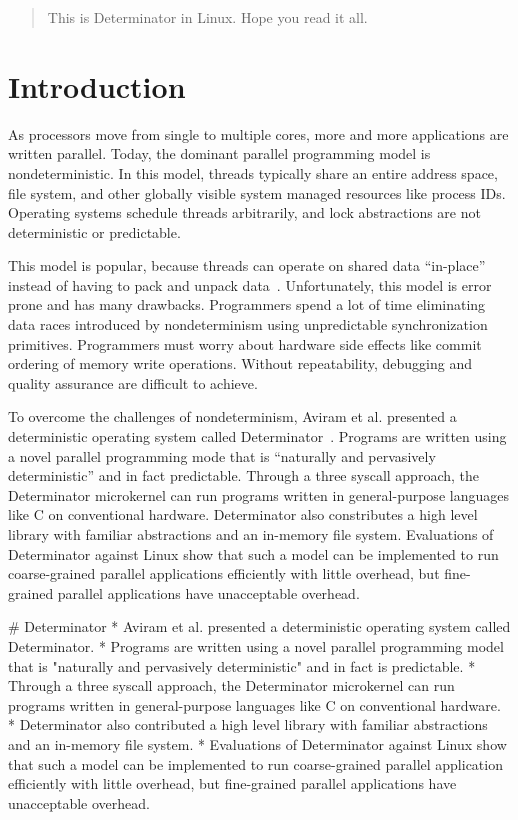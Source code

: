 
\begin{abstract}
This is Determinator in Linux. Hope you read it all.
\end{abstract}

\section{Introduction}
As processors move from single to multiple cores, more and more applications are
written parallel. Today, the dominant parallel programming model is
nondeterministic. In this model, threads typically share an entire address
space, file system, and other globally visible system managed resources like
process IDs. Operating systems schedule threads arbitrarily, and
lock abstractions are not deterministic or predictable.

This model is popular,
because threads can operate on shared data ``in-place'' instead of having to
pack and unpack data~\cite{Aviram10}. Unfortunately, this model is
error prone and has many drawbacks. Programmers spend a lot of time eliminating
data races introduced by nondeterminism using unpredictable synchronization
primitives. Programmers must worry about hardware side effects like commit
ordering of memory write operations. Without repeatability, debugging and
quality assurance are difficult to achieve.

To overcome the challenges of nondeterminism, Aviram et al. presented a
deterministic operating system called Determinator~\cite{Aviram10}.
Programs are written using a novel parallel programming mode that is ``naturally
and pervasively deterministic'' and in fact predictable. Through a three
syscall approach, the
Determinator microkernel can run programs written in general-purpose languages
like C on conventional hardware. Determinator also constributes a high level
library with familiar abstractions and an in-memory file system. Evaluations
of Determinator against Linux show that such a model can be implemented to run
coarse-grained parallel applications efficiently with little overhead, but
fine-grained parallel applications have unacceptable overhead.

\iffalse

# Determinator
* Aviram et al. presented a deterministic operating system called Determinator.
* Programs are written using a novel parallel programming model that is
  "naturally and pervasively deterministic" and in fact is predictable.
* Through a three syscall approach, the Determinator microkernel can run
  programs written in general-purpose languages like C on conventional hardware.
* Determinator also contributed a high level library with familiar abstractions
  and an in-memory file system.
* Evaluations of Determinator against Linux show that such a model can be
  implemented to run coarse-grained parallel application efficiently with little
  overhead, but fine-grained parallel applications have unacceptable overhead.

